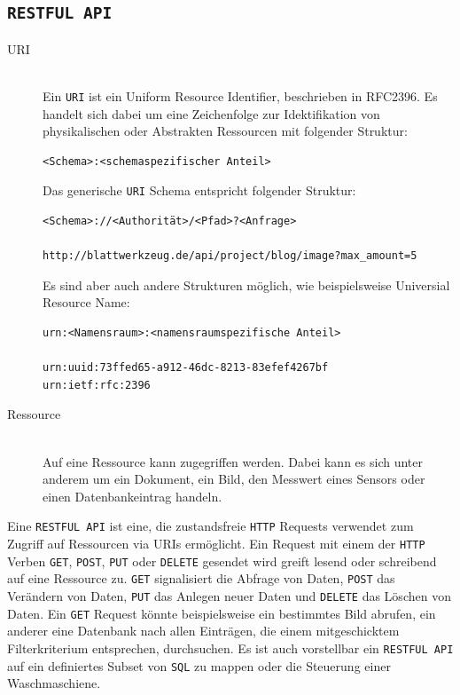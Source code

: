\subsection{\texttt{RESTFUL API}}

\begin{description}
\item[URI] \mbox{}\\ Ein \texttt{URI} ist ein Uniform Resource Identifier,
  beschrieben in RFC2396. Es handelt sich dabei um eine Zeichenfolge zur
  Idektifikation von physikalischen oder Abstrakten Ressourcen mit folgender
  Struktur:
\begin{verbatim}
<Schema>:<schemaspezifischer Anteil>
\end{verbatim}
Das generische \texttt{URI} Schema entspricht folgender Struktur:
\begin{verbatim}
<Schema>://<Authorität>/<Pfad>?<Anfrage>

http://blattwerkzeug.de/api/project/blog/image?max_amount=5
\end{verbatim}
Es sind aber auch andere Strukturen möglich, wie beispielsweise Universial
Resource Name:
\begin{verbatim}
urn:<Namensraum>:<namensraumspezifische Anteil>

urn:uuid:73ffed65-a912-46dc-8213-83efef4267bf
urn:ietf:rfc:2396
\end{verbatim}
\item[Ressource] \mbox{}\\ Auf eine Ressource kann zugegriffen werden. Dabei
  kann es sich unter anderem um ein Dokument, ein Bild, den Messwert eines
  Sensors oder einen Datenbankeintrag handeln.
\end{description}

Eine \texttt{RESTFUL API} ist eine, die zustandsfreie \texttt{HTTP} Requests
verwendet zum Zugriff auf Ressourcen via URIs ermöglicht. Ein Request mit
einem der \texttt{HTTP} Verben \texttt{GET}, \texttt{POST}, \texttt{PUT} oder
\texttt{DELETE} gesendet wird greift lesend oder schreibend auf eine Ressource
zu. \texttt{GET} signalisiert die Abfrage von Daten, \texttt{POST} das Verändern
von Daten, \texttt{PUT} das Anlegen neuer Daten und \texttt{DELETE} das Löschen
von Daten. Ein \texttt{GET} Request könnte beispielsweise ein bestimmtes Bild
abrufen, ein anderer eine Datenbank nach allen Einträgen, die einem
mitgeschicktem Filterkriterium entsprechen, durchsuchen. Es ist auch vorstellbar
ein \texttt{RESTFUL API} auf ein definiertes Subset von \texttt{SQL} zu mappen
oder die Steuerung einer Waschmaschiene.

